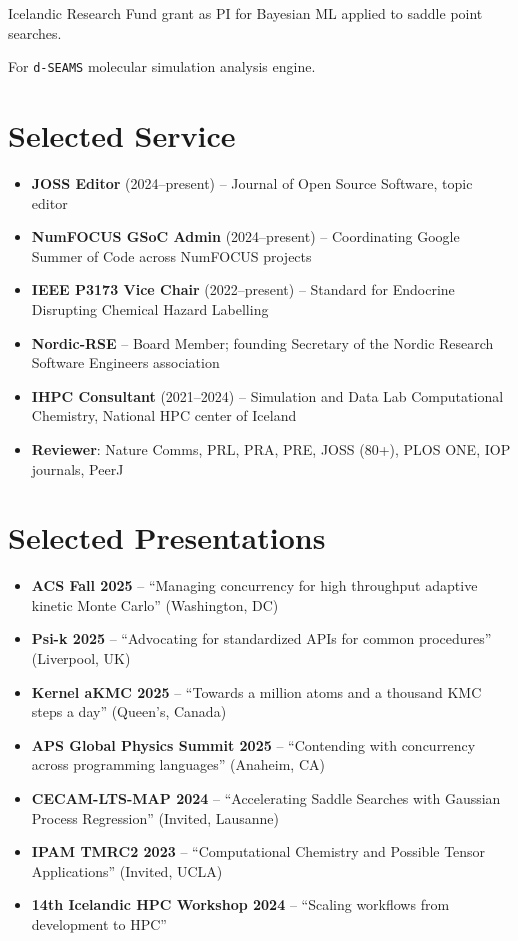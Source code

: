 \documentclass[twopage]{rgcv}
\begin{document}
\sectionspace

Icelandic Research Fund grant as PI for Bayesian ML applied to saddle point searches.

\sectionspace

For \texttt{d-SEAMS} molecular simulation analysis engine.

\sectionspace

\section{Selected Service}
\begin{itemize}
\item \textbf{JOSS Editor} (2024--present) -- Journal of Open Source Software, topic editor
\item \textbf{NumFOCUS GSoC Admin} (2024--present) -- Coordinating Google Summer of Code across NumFOCUS projects
\item \textbf{IEEE P3173 Vice Chair} (2022--present) -- Standard for Endocrine Disrupting Chemical Hazard Labelling
\item \textbf{Nordic-RSE} -- Board Member; founding Secretary of the Nordic Research Software Engineers association
\item \textbf{IHPC Consultant} (2021--2024) -- Simulation and Data Lab Computational Chemistry, National HPC center of Iceland
\item \textbf{Reviewer}: Nature Comms, PRL, PRA, PRE, JOSS (80+), PLOS ONE, IOP journals, PeerJ
\end{itemize}
\section{Selected Presentations}
\begin{itemize}
\item \textbf{ACS Fall 2025} -- ``Managing concurrency for high throughput adaptive kinetic Monte Carlo'' (Washington, DC)
\item \textbf{Psi-k 2025} -- ``Advocating for standardized APIs for common procedures'' (Liverpool, UK)
\item \textbf{Kernel aKMC 2025} -- ``Towards a million atoms and a thousand KMC steps a day'' (Queen's, Canada)
\item \textbf{APS Global Physics Summit 2025} -- ``Contending with concurrency across programming languages'' (Anaheim, CA)
\item \textbf{CECAM-LTS-MAP 2024} -- ``Accelerating Saddle Searches with Gaussian Process Regression'' (Invited, Lausanne)
\item \textbf{IPAM TMRC2 2023} -- ``Computational Chemistry and Possible Tensor Applications'' (Invited, UCLA)
\item \textbf{14th Icelandic HPC Workshop 2024} -- ``Scaling workflows from development to HPC''
\end{itemize}
\end{document}
